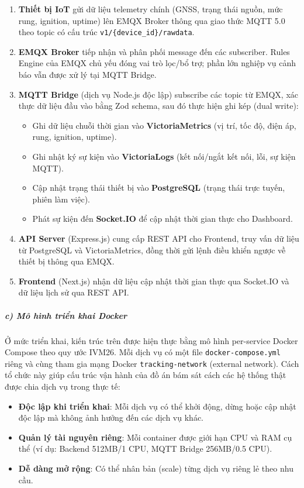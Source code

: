 \documentclass[a4paper]{extarticle}
\providecommand{\tightlist}{%
  \setlength{\itemsep}{0pt}\setlength{\parskip}{0pt}}
\begin{document}
\begin{enumerate}
\def\labelenumi{\arabic{enumi}.}
\tightlist
\item
  \textbf{Thiết bị IoT} gửi dữ liệu telemetry chính (GNSS, trạng thái
  nguồn, mức rung, ignition, uptime) lên EMQX Broker thông qua giao thức
  MQTT 5.0 theo topic có cấu trúc \texttt{v1/\{device\_id\}/rawdata}.
\item
  \textbf{EMQX Broker} tiếp nhận và phân phối message đến các
  subscriber. Rules Engine của EMQX chủ yếu đóng vai trò lọc/bổ trợ;
  phần lớn nghiệp vụ cảnh báo vẫn được xử lý tại MQTT Bridge.
\item
  \textbf{MQTT Bridge} (dịch vụ Node.js độc lập) subscribe các topic từ
  EMQX, xác thực dữ liệu đầu vào bằng Zod schema, sau đó thực hiện ghi
  kép (dual write):

  \begin{itemize}
  \tightlist
  \item
    Ghi dữ liệu chuỗi thời gian vào \textbf{VictoriaMetrics} (vị trí,
    tốc độ, điện áp, rung, ignition, uptime).
  \item
    Ghi nhật ký sự kiện vào \textbf{VictoriaLogs} (kết nối/ngắt kết nối,
    lỗi, sự kiện MQTT).
  \item
    Cập nhật trạng thái thiết bị vào \textbf{PostgreSQL} (trạng thái
    trực tuyến, phiên làm việc).
  \item
    Phát sự kiện đến \textbf{Socket.IO} để cập nhật thời gian thực cho
    Dashboard.
  \end{itemize}
\item
  \textbf{API Server} (Express.js) cung cấp REST API cho Frontend, truy
  vấn dữ liệu từ PostgreSQL và VictoriaMetrics, đồng thời gửi lệnh điều
  khiển ngược về thiết bị thông qua EMQX.
\item
  \textbf{Frontend} (Next.js) nhận dữ liệu cập nhật thời gian thực qua
  Socket.IO và dữ liệu lịch sử qua REST API.
\end{enumerate}

\subparagraph{c) Mô hình triển khai
Docker}\label{c-muxf4-huxecnh-triux1ec3n-khai-docker}

Ở mức triển khai, kiến trúc trên được hiện thực bằng mô hình per-service
Docker Compose theo quy ước IVM26. Mỗi dịch vụ có một file
\texttt{docker-compose.yml} riêng và cùng tham gia mạng Docker
\texttt{tracking-network} (external network). Cách tổ chức này giúp cấu
trúc vận hành của đồ án bám sát cách các hệ thống thật được chia dịch vụ
trong thực tế:

\begin{itemize}
\tightlist
\item
  \textbf{Độc lập khi triển khai}: Mỗi dịch vụ có thể khởi động, dừng
  hoặc cập nhật độc lập mà không ảnh hưởng đến các dịch vụ khác.
\item
  \textbf{Quản lý tài nguyên riêng}: Mỗi container được giới hạn CPU và
  RAM cụ thể (ví dụ: Backend 512MB/1 CPU, MQTT Bridge 256MB/0.5 CPU).
\item
  \textbf{Dễ dàng mở rộng}: Có thể nhân bản (scale) từng dịch vụ riêng
  lẻ theo nhu cầu.
\end{itemize}
\end{document}
